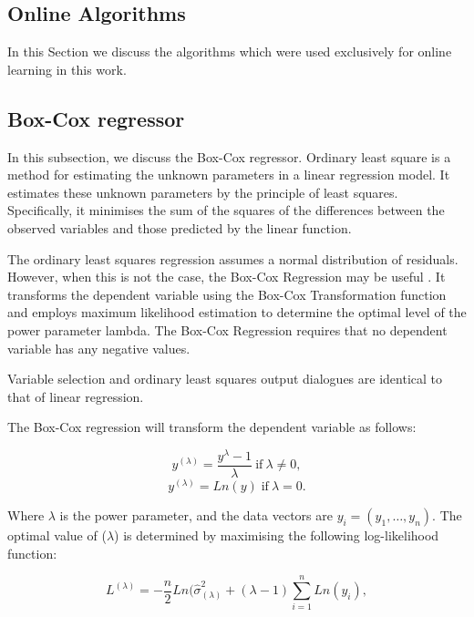 \subsection{Online Algorithms}

In this Section we discuss the algorithms which were used exclusively for online learning in this work.

\subsection{Box-Cox regressor}

In this subsection, we discuss the Box-Cox regressor. Ordinary least square is a method for estimating the unknown parameters in a linear regression model. It estimates these unknown parameters by the principle of least squares. Specifically, it minimises the sum of the squares of the differences between the observed variables and those predicted by the linear function.

The ordinary least squares regression assumes a normal distribution of residuals. However, when this is not the case, the Box-Cox Regression may be useful \cite{Box1964}. It transforms the dependent variable using the Box-Cox Transformation function and employs maximum likelihood estimation to determine the optimal level of the power parameter lambda. The Box-Cox Regression requires that no dependent variable has any negative values.

Variable selection and ordinary least squares output dialogues are identical to that of linear regression. 

The Box-Cox regression will transform the dependent variable as follows:

\begin{equation}
y^{(\lambda)} = \frac{y^{\lambda}-1}{\lambda}\:\text{if} \:\lambda\neq0,
\end{equation}
\begin{equation}
y^{(\lambda)} = Ln(y)\; \text{if}\: \lambda=0.
\end{equation}

\noindent Where $\lambda$ is the power parameter, and the data vectors are $y_i=(y_1,\ldots,y_n)$. The optimal value of ($\lambda$) is determined by maximising the following log-likelihood function:

\begin{equation}
L^{(\lambda)}=-\frac{n}{2}Ln(\hat{\sigma}^2_{(\lambda)}+(\lambda - 1)\sum_{i=1}^nLn(y_i),
\end{equation}

